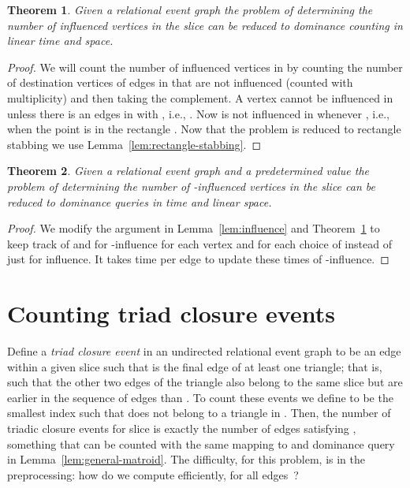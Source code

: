 \documentclass[11pt]{article}
\newtheorem{theorem}{Theorem}
\begin{document}
\begin{theorem}\label{thm:influence}
Given a relational event graph  the problem of determining the number of influenced vertices in the slice  can be reduced to dominance counting in linear time and space.
\end{theorem}
\begin{proof}
We will count the number of influenced vertices in  by counting the number of destination vertices of edges in  that are not influenced (counted with multiplicity) and then taking the complement. A vertex  cannot be influenced in  unless there is an edges  in  with , i.e., . Now  is not influenced in  whenever , i.e., when the point  is in the rectangle . Now that the problem is reduced to rectangle stabbing we use Lemma~\ref{lem:rectangle-stabbing}.
\end{proof}

\begin{theorem}
Given a relational event graph and a predetermined value  the problem of determining the number of -influenced vertices in the slice  can be reduced to dominance queries in  time and linear space.
\end{theorem}
\begin{proof}
We modify the argument in Lemma~\ref{lem:influence} and Theorem~\ref{thm:influence} to keep track of  and  for -influence for each vertex and for each choice of   instead of just for influence. It takes  time per edge to update these times of -influence.
\end{proof}

\section{Counting triad closure events}

Define a \emph{triad closure event} in an undirected relational event graph to be an edge  within a given slice  such that  is the final edge of at least one triangle; that is, such that the other two edges of the triangle also belong to the same slice but are earlier in the sequence of edges than .
To count these events we define  to be the smallest index  such that  does not belong to a triangle in . Then, the number of triadic closure events for slice  is exactly the number of edges  satisfying , something that can be counted with the same mapping to  and dominance query in Lemma~\ref{lem:general-matroid}. The difficulty, for this problem, is in the preprocessing: how do we compute  efficiently, for all edges~?
\end{document}
